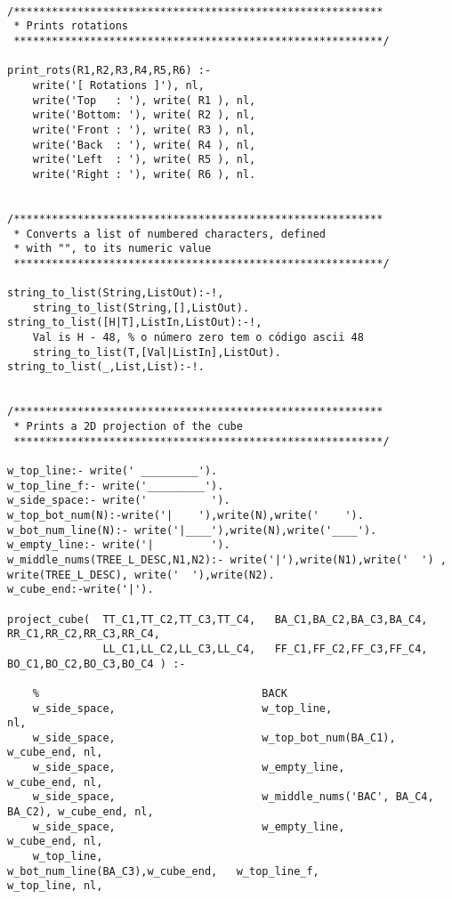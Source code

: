 \begin{lstlisting}
	
/**********************************************************
 * Prints rotations
 **********************************************************/
	
print_rots(R1,R2,R3,R4,R5,R6) :-
	write('[ Rotations ]'), nl,
	write('Top   : '), write( R1 ), nl,
	write('Bottom: '), write( R2 ), nl,
	write('Front : '), write( R3 ), nl,
	write('Back  : '), write( R4 ), nl,
	write('Left  : '), write( R5 ), nl,
	write('Right : '), write( R6 ), nl.

	
/**********************************************************
 * Converts a list of numbered characters, defined
 * with "", to its numeric value
 **********************************************************/
 
string_to_list(String,ListOut):-!,
	string_to_list(String,[],ListOut).
string_to_list([H|T],ListIn,ListOut):-!,
	Val is H - 48, % o número zero tem o código ascii 48
	string_to_list(T,[Val|ListIn],ListOut).
string_to_list(_,List,List):-!.


/**********************************************************
 * Prints a 2D projection of the cube
 **********************************************************/

w_top_line:- write(' _________').
w_top_line_f:- write('_________').
w_side_space:- write('          ').
w_top_bot_num(N):-write('|    '),write(N),write('    ').
w_bot_num_line(N):- write('|____'),write(N),write('____').
w_empty_line:- write('|         ').
w_middle_nums(TREE_L_DESC,N1,N2):- write('|'),write(N1),write('  ') , write(TREE_L_DESC), write('  '),write(N2).
w_cube_end:-write('|').

project_cube(  TT_C1,TT_C2,TT_C3,TT_C4,   BA_C1,BA_C2,BA_C3,BA_C4,   RR_C1,RR_C2,RR_C3,RR_C4,
               LL_C1,LL_C2,LL_C3,LL_C4,   FF_C1,FF_C2,FF_C3,FF_C4,   BO_C1,BO_C2,BO_C3,BO_C4 ) :-
	
	%                                   BACK
	w_side_space,                       w_top_line,                         nl,
	w_side_space,                       w_top_bot_num(BA_C1),               w_cube_end, nl,
	w_side_space,                       w_empty_line,                       w_cube_end, nl,
	w_side_space,                       w_middle_nums('BAC', BA_C4, BA_C2), w_cube_end, nl,
	w_side_space,                       w_empty_line,                       w_cube_end, nl,
	w_top_line,                         w_bot_num_line(BA_C3),w_cube_end,   w_top_line_f,                      w_top_line, nl,
	

\end{lstlisting}
